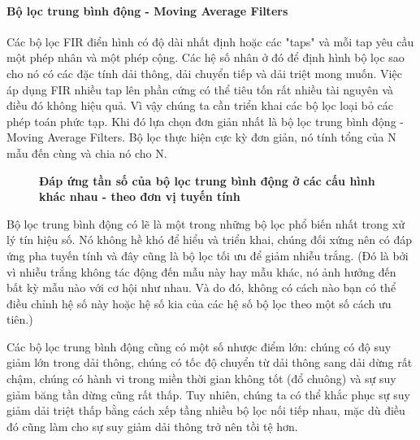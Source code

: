 \paragraph{Bộ lọc trung bình động - Moving Average Filters}\label{maf}
Các bộ lọc FIR điển hình có độ dài nhất định hoặc các "taps" và mỗi tap yêu cầu một phép nhân và một phép cộng. Các hệ số nhân ở đó để định hình bộ lọc sao cho nó có các đặc tính dải thông, dải chuyển tiếp và dải triệt mong muốn. Việc áp dụng FIR nhiều tap lên phần cứng có thể tiêu tốn rất nhiều tài nguyên và điều đó không hiệu quả. Vì vậy chúng ta cần triển khai các bộ lọc loại bỏ các phép toán phức tạp. Khi đó lựa chọn đơn giản nhất là bộ lọc trung bình động - Moving Average Filters. Bộ lọc thực hiện cực kỳ đơn giản, nó tính tổng của N mẫu đến cùng và chia nó cho N.
\begin{figure}[H]
    \centering
    
    \caption[Đáp ứng tần số của bộ lọc trung bình động ở các cấu hình khác nhau - theo đơn vị tuyến tính]{\bfseries \fontsize{12pt}{0pt}\selectfont Đáp ứng tần số của bộ lọc trung bình động ở các cấu hình khác nhau - theo đơn vị tuyến tính}
    \label{moving_average_filter_overview_linear}
\end{figure}
Bộ lọc trung bình động có lẽ là một trong những bộ lọc phổ biến nhất trong xử lý tín hiệu số. Nó không hề khó để hiểu và triển khai, chúng đối xứng nên có đáp ứng pha tuyến tính và đây cũng là bộ lọc tối ưu để giảm nhiễu trắng. (Đó là bởi vì nhiễu trắng không tác động đến mẫu này hay mẫu khác, nó ảnh hưởng đến bất kỳ mẫu nào với cơ hội như nhau. Và do đó, không có cách nào bạn có thể điều chỉnh hệ số này hoặc hệ số kia của các hệ số bộ lọc theo một số cách ưu tiên.)

Các bộ lọc trung bình động cũng có một số nhược điểm lớn: chúng có độ suy giảm lớn trong dải thông, chúng có tốc độ chuyển từ dải thông sang dải dừng rất chậm, chúng có hành vi trong miền thời gian không tốt (đổ chuông) và sự suy giảm băng tần dừng cũng rất thấp. Tuy nhiên, chúng ta có thể khắc phục sự suy giảm dải triệt thấp bằng cách xếp tầng nhiều bộ lọc nối tiếp nhau, mặc dù điều đó cũng làm cho sự suy giảm dải thông trở nên tồi tệ hơn.


